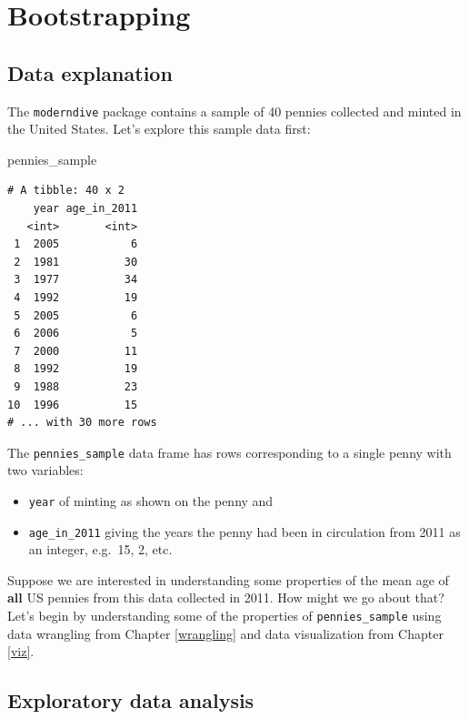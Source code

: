 \documentclass[12pt,]{krantz}
\makeatletter
\newenvironment{Shaded}{\begin{snugshade}}{\end{snugshade}}
\newcommand{\NormalTok}[1]{#1}
\providecommand{\tightlist}{%
  \setlength{\itemsep}{0pt}\setlength{\parskip}{0pt}}
\newenvironment{kframe}{%
\medskip{}
\setlength{\fboxsep}{.8em}
 \def\at@end@of@kframe{}%
 \ifinner\ifhmode%
  \def\at@end@of@kframe{\end{minipage}}%
  \begin{minipage}{\columnwidth}%
 \fi\fi%
 \def\FrameCommand##1{\hskip\@totalleftmargin \hskip-\fboxsep
 \colorbox{shadecolor}{##1}\hskip-\fboxsep
     \hskip-\linewidth \hskip-\@totalleftmargin \hskip\columnwidth}%
 \MakeFramed {\advance\hsize-\width
   \@totalleftmargin\z@ \linewidth\hsize
   \@setminipage}}%
 {\par\unskip\endMakeFramed%
 \at@end@of@kframe}
\renewenvironment{Shaded}{\begin{kframe}}{\end{kframe}}
\makeatother
\begin{document}
\section{Bootstrapping}\label{bootstrapping}

\subsection{Data explanation}\label{data-explanation}

The \texttt{moderndive} package contains a sample of 40 pennies
collected and minted in the United States. Let's explore this sample
data first:

\begin{Shaded}
\begin{Highlighting}[]
\NormalTok{pennies_sample}
\end{Highlighting}
\end{Shaded}

\begin{verbatim}
# A tibble: 40 x 2
    year age_in_2011
   <int>       <int>
 1  2005           6
 2  1981          30
 3  1977          34
 4  1992          19
 5  2005           6
 6  2006           5
 7  2000          11
 8  1992          19
 9  1988          23
10  1996          15
# ... with 30 more rows
\end{verbatim}

The \texttt{pennies\_sample} data frame has rows corresponding to a
single penny with two variables:

\begin{itemize}
\tightlist
\item
  \texttt{year} of minting as shown on the penny and
\item
  \texttt{age\_in\_2011} giving the years the penny had been in
  circulation from 2011 as an integer, e.g.~15, 2, etc.
\end{itemize}

Suppose we are interested in understanding some properties of the mean
age of \textbf{all} US pennies from this data collected in 2011. How
might we go about that? Let's begin by understanding some of the
properties of \texttt{pennies\_sample} using data wrangling from Chapter
\ref{wrangling} and data visualization from Chapter \ref{viz}.

\subsection{Exploratory data analysis}\label{exploratory-data-analysis}
\end{document}
